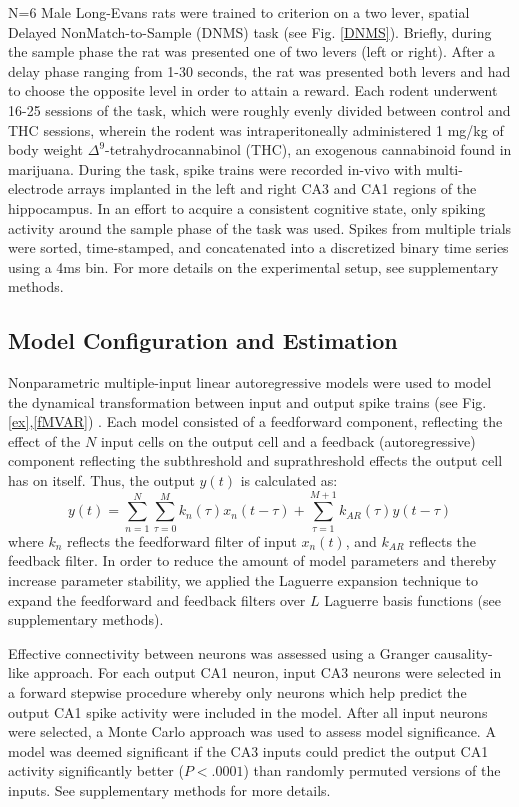 \documentclass[11pt,a4paper,final]{article}
\begin{document}
N=6 Male Long-Evans rats were trained to criterion on a two lever, spatial Delayed NonMatch-to-Sample (DNMS) task (see Fig. \ref{DNMS}).
Briefly, during the sample phase the rat was presented one of two levers (left or right).
After a delay phase ranging from 1-30 seconds, the rat was presented both levers and had to choose the opposite level in order to attain a reward.
Each rodent underwent 16-25 sessions of the task, which were roughly evenly divided between control and THC sessions, wherein the rodent was intraperitoneally administered 1 mg/kg of body weight $\Delta^9$-tetrahydrocannabinol (THC), an exogenous cannabinoid found in marijuana.
During the task, spike trains were recorded in-vivo with multi-electrode arrays implanted in the left and right CA3 and CA1 regions of the hippocampus.
In an effort to acquire a consistent cognitive state, only spiking activity around the sample phase of the task was used.
Spikes from multiple trials were sorted, time-stamped, and concatenated into a discretized binary time series using a 4ms bin.
For more details on the experimental setup, see supplementary methods.

    \subsection{Model Configuration and Estimation}
Nonparametric multiple-input linear autoregressive models were used to model the dynamical transformation between input and output spike trains (see Fig. \ref{ex},\ref{fMVAR}) \citep{sandler14,sandler15}.
Each model consisted of a feedforward component, reflecting the effect of the $N$ input cells on the output cell and a feedback (autoregressive) component reflecting the subthreshold and suprathreshold effects the output cell has on itself. Thus, the output $y(t)$ is calculated as:
\begin{equation}
    y(t)=\sum_{n=1}^{N}\sum_{\tau=0}^{M}k_{n}(\tau)x_{n}(t-\tau)+\sum_{\tau=1}^{M+1}k_{AR}(\tau)y(t-\tau)
\label{eq:MVAR}
\end{equation}
where $k_{n}$ reflects the feedforward filter of input $x_n(t)$, and $k_{AR}$ reflects the feedback filter.
In order to reduce the amount of model parameters and thereby increase parameter stability, we applied the Laguerre expansion technique to expand the feedforward and feedback filters over $L$ Laguerre basis functions (see supplementary methods).

Effective connectivity between neurons was assessed using a Granger causality-like approach.
For each output CA1 neuron, input CA3 neurons were selected in a forward stepwise procedure whereby only neurons which help predict the output CA1 spike activity were included in the model.
After all input neurons were selected, a Monte Carlo approach was used to assess model significance.
A model was deemed significant if the CA3 inputs could predict the output CA1 activity significantly better ($P<.0001$) than randomly permuted versions of the inputs.
See supplementary methods for more details.
\end{document}
